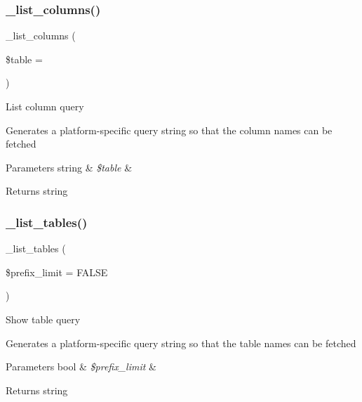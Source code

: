 \subsubsection{\texorpdfstring{\+\_\+list\+\_\+columns()}{\_list\_columns()}}
{\footnotesize\ttfamily \+\_\+list\+\_\+columns (\begin{DoxyParamCaption}\item[{}]{\$table = {\ttfamily \textquotesingle{}\textquotesingle{}} }\end{DoxyParamCaption})\hspace{0.3cm}{\ttfamily [protected]}}

List column query

Generates a platform-\/specific query string so that the column names can be fetched


\begin{DoxyParams}[1]{Parameters}
string & {\em \$table} & \\
\hline
\end{DoxyParams}
\begin{DoxyReturn}{Returns}
string 
\end{DoxyReturn}
\mbox{\label{class_c_i___d_b__postgre__driver_a435c0f3ce54fe7daa178baa8532ebd54}} 
\subsubsection{\texorpdfstring{\+\_\+list\+\_\+tables()}{\_list\_tables()}}
{\footnotesize\ttfamily \+\_\+list\+\_\+tables (\begin{DoxyParamCaption}\item[{}]{\$prefix\+\_\+limit = {\ttfamily FALSE} }\end{DoxyParamCaption})\hspace{0.3cm}{\ttfamily [protected]}}

Show table query

Generates a platform-\/specific query string so that the table names can be fetched


\begin{DoxyParams}[1]{Parameters}
bool & {\em \$prefix\+\_\+limit} & \\
\hline
\end{DoxyParams}
\begin{DoxyReturn}{Returns}
string 
\end{DoxyReturn}
\mbox{\label{class_c_i___d_b__postgre__driver_ac81ac882c1d54347d810199a15856aac}} 
